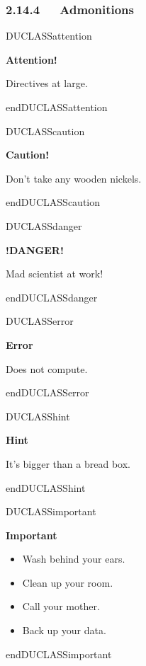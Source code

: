 \documentclass[a4paper]{article}
\newenvironment{DUclass}[1]%
    {%
     \def\DocutilsClassFunctionName{DUCLASS#1}
     \csname \DocutilsClassFunctionName \endcsname}%
    {\csname end\DocutilsClassFunctionName \endcsname}%
\newenvironment{DUadmonition}%
    {\begin{center}
       \begin{lrbox}{\DUadmonitionbox}
         \begin{minipage}{0.9\linewidth}
    }%
    {    \end{minipage}
       \end{lrbox}
       \fbox{\usebox{\DUadmonitionbox}}
     \end{center}
    }
\providecommand*{\DUtitle}[1]{%
  \smallskip\noindent\textbf{#1}\smallskip}
\begin{document}
\subsubsection{2.14.4   Admonitions}

\begin{DUclass}{attention}
\begin{DUadmonition}
\DUtitle{Attention!}

Directives at large.
\end{DUadmonition}
\end{DUclass}

\begin{DUclass}{caution}
\begin{DUadmonition}
\DUtitle{Caution!}

Don’t take any wooden nickels.
\end{DUadmonition}
\end{DUclass}

\begin{DUclass}{danger}
\begin{DUadmonition}
\DUtitle{!DANGER!}

Mad scientist at work!
\end{DUadmonition}
\end{DUclass}

\begin{DUclass}{error}
\begin{DUadmonition}
\DUtitle{Error}

Does not compute.
\end{DUadmonition}
\end{DUclass}

\begin{DUclass}{hint}
\begin{DUadmonition}
\DUtitle{Hint}

It’s bigger than a bread box.
\end{DUadmonition}
\end{DUclass}

\begin{DUclass}{important}
\begin{DUadmonition}
\DUtitle{Important}

\begin{itemize}
\item Wash behind your ears.

\item Clean up your room.

\item Call your mother.

\item Back up your data.
\end{itemize}
\end{DUadmonition}
\end{DUclass}
\end{document}
